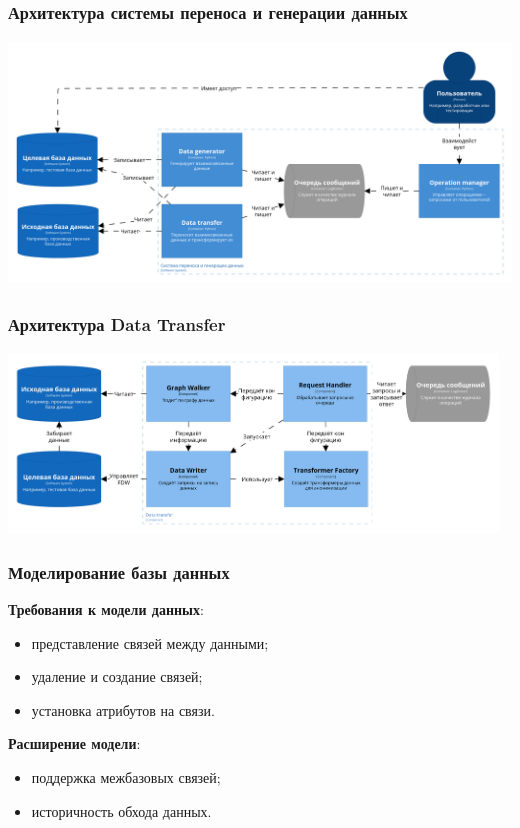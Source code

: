 \documentclass[pdf, hyperref={unicode}, aspectratio=169]{beamer}
\begin{document}
\begin{frame}
\frametitle{Архитектура системы переноса и генерации данных}
	\begin{center}
		\includegraphics[height = 6.5cm]{img/structurizr-Containers-cut}
	\end{center}
\end{frame}


\begin{frame}
\frametitle{Архитектура Data Transfer}
	\begin{center}
		\includegraphics[width = 13cm]{img/structurizr-DataTransferComponents-cut}
	\end{center}
\end{frame}


\begin{frame}
\frametitle{Моделирование базы данных}
	\textbf{Требования к модели данных}:
	\begin{itemize}
		\item представление связей между данными;
		\item удаление и создание связей;
		\item установка атрибутов на связи.
	\end{itemize}

	\textbf{Расширение модели}:
	\begin{itemize}
		\item поддержка межбазовых связей;
		\item историчность обхода данных.
	\end{itemize}
\end{frame}
\end{document}
